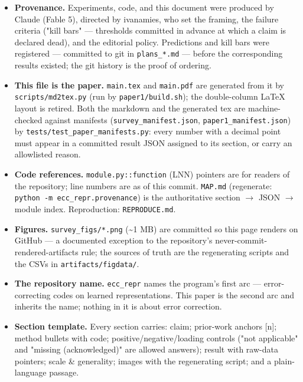 \documentclass[10pt]{article}
\begin{document}
\begin{itemize}\setlength\itemsep{1pt}
\item \textbf{Provenance.} Experiments, code, and this document were produced by Claude (Fable 5), directed by ivanamies, who set the framing, the failure criteria ("kill bars" --- thresholds committed in advance at which a claim is declared dead), and the editorial policy. Predictions and kill bars were registered --- committed to git in \texttt{plans\_*.md} --- before the corresponding results existed; the git history is the proof of ordering.
\item \textbf{This file is the paper.} \texttt{main.tex} and \texttt{main.pdf} are generated from it by \texttt{scripts/md2tex.py} (run by \texttt{paper1/build.sh}); the double-column LaTeX layout is retired. Both the markdown and the generated tex are machine-checked against manifests (\texttt{survey\_manifest.json}, \texttt{paper1\_manifest.json}) by \texttt{tests/test\_paper\_manifests.py}: every number with a decimal point must appear in a committed result JSON assigned to its section, or carry an allowlisted reason.
\item \textbf{Code references.} \texttt{module.py::function} (LNN) pointers are for readers of the repository; line numbers are as of this commit. \texttt{MAP.md} (regenerate: \texttt{python -m ecc\_repr.provenance}) is the authoritative section $\to$ JSON $\to$ module index. Reproduction: \texttt{REPRODUCE.md}.
\item \textbf{Figures.} \texttt{survey\_figs/*.png} (\textasciitilde{}1 MB) are committed so this page renders on GitHub --- a documented exception to the repository's never-commit-rendered-artifacts rule; the sources of truth are the regenerating scripts and the CSVs in \texttt{artifacts/figdata/}.
\item \textbf{The repository name.} \texttt{ecc\_repr} names the program's first arc --- error-correcting codes on learned representations. This paper is the second arc and inherits the name; nothing in it is about error correction.
\item \textbf{Section template.} Every section carries: claim; prior-work anchors [n]; method bullets with code; positive/negative/loading controls ("not applicable" and "missing (acknowledged)" are allowed answers); result with raw-data pointers; scale \& generality; images with the regenerating script; and a plain-language passage.
\end{itemize}
\end{document}
